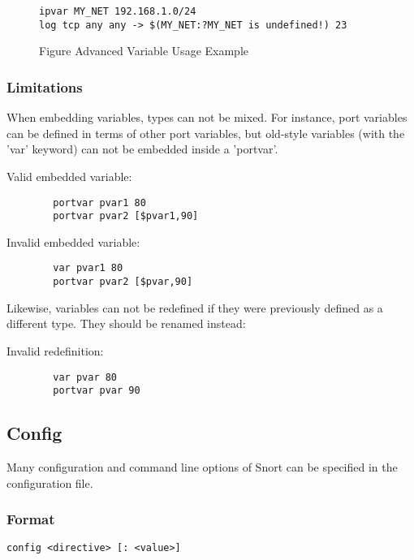 \documentclass[english]{report}
\begin{document}
\begin{figure}[!hbpt]
\begin{verbatim}
ipvar MY_NET 192.168.1.0/24
log tcp any any -> $(MY_NET:?MY_NET is undefined!) 23
\end{verbatim}

\caption{Figure Advanced Variable Usage Example\label{advanced variable usage}}
\end{figure}

\subsubsection{Limitations}

When embedding variables, types can not be mixed.  For instance, port 
variables can be defined in terms of other port variables, but old-style 
variables (with the 'var' keyword) can not be embedded inside a 'portvar'.

    Valid embedded variable:

\begin{verbatim}
        portvar pvar1 80
        portvar pvar2 [$pvar1,90]
\end{verbatim}

    Invalid embedded variable:
        
\begin{verbatim}
        var pvar1 80
        portvar pvar2 [$pvar,90]
\end{verbatim}

Likewise, variables can not be redefined if they were previously defined as 
a different type.  They should be renamed instead:

    Invalid redefinition:
        
\begin{verbatim}
        var pvar 80
        portvar pvar 90
\end{verbatim}

\subsection{Config\label{Config}}

Many configuration and command line options of Snort can be specified
in the configuration file. 

\subsubsection{Format}

\begin{center}
\begin{verbatim}
config <directive> [: <value>]
\end{verbatim}
\end{center}
\end{document}
